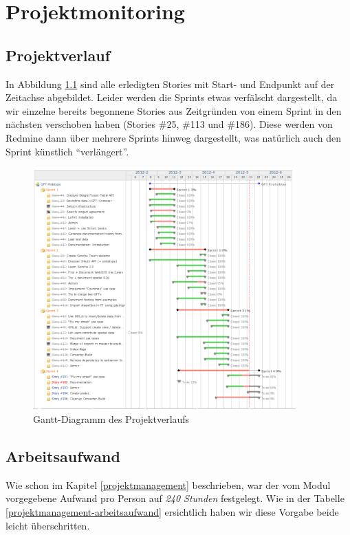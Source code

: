 \chapter{Projektmonitoring}
\label{projektmonitoring}

\section{Projektverlauf}
In Abbildung \ref{overall_stories_gantt_chart} sind alle erledigten Stories mit Start- und Endpunkt auf der Zeitachse abgebildet. Leider werden die Sprints etwas verfälscht dargestellt, da wir einzelne bereits begonnene Stories aus Zeitgründen von einem Sprint in den nächsten verschoben haben (Stories \#25, \#113 und \#186). Diese werden von Redmine dann über mehrere Sprints hinweg dargestellt, was natürlich auch den Sprint künstlich "`verlängert"'.

\begin{figure}[H]
	\centering
	\includegraphics[width=0.9\textwidth]{images/projektmanagement/overall_stories_gantt_chart}
	\caption{Gantt-Diagramm des Projektverlaufs}
	\label{overall_stories_gantt_chart}
\end{figure}

\section{Arbeitsaufwand}
Wie schon im Kapitel \ref{projektmanagement} beschrieben, war der vom Modul vorgegebene Aufwand pro Person auf \emph{240 Stunden} festgelegt. Wie in der Tabelle \ref{projektmanagement-arbeitsaufwand} ersichtlich haben wir diese Vorgabe beide leicht überschritten.

